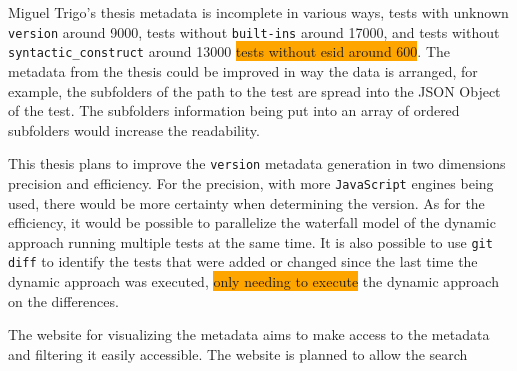 \documentclass[runningheads]{llncs}
\begin{document}
Miguel Trigo's thesis metadata is incomplete in various ways, tests with unknown \texttt{version} around 9000, tests without \texttt{built-ins} around 17000, and tests without \texttt{syntactic\_construct} around 13000 \colorbox{orange}{tests without esid around 600}.
%
The metadata from the thesis could be improved in way the data is arranged, for example, the subfolders of the path to the test are spread into the JSON Object of the test. The subfolders information being put into an array of ordered subfolders would increase the readability.



This thesis plans to improve the \texttt{version} metadata generation in two dimensions precision and efficiency.
For the precision, with more \texttt{JavaScript} engines being used, there would be more certainty when determining the version.
As for the efficiency, it would be possible to parallelize the waterfall model of the dynamic approach running multiple tests at the same time. It is also possible to use \texttt{git diff} to identify the tests that were added or changed since the last time the dynamic approach was executed, \colorbox{orange}{ only needing to execute} the dynamic approach on the differences.



The website for visualizing the metadata aims to make access to the metadata and filtering it easily accessible. The website is planned to allow the search 
\end{document}
